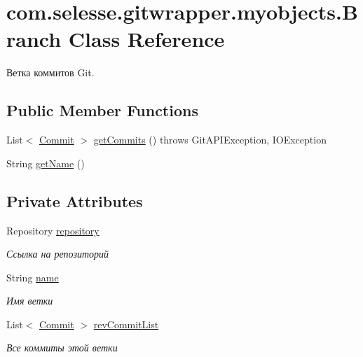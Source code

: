 \hypertarget{classcom_1_1selesse_1_1gitwrapper_1_1myobjects_1_1_branch}{}\section{com.\+selesse.\+gitwrapper.\+myobjects.\+Branch Class Reference}
\label{classcom_1_1selesse_1_1gitwrapper_1_1myobjects_1_1_branch}


Ветка коммитов Git.  


\subsection*{Public Member Functions}
\begin{DoxyCompactItemize}
\item 
List$<$ \hyperlink{classcom_1_1selesse_1_1gitwrapper_1_1myobjects_1_1_commit}{Commit} $>$ \hyperlink{classcom_1_1selesse_1_1gitwrapper_1_1myobjects_1_1_branch_adaccf954960eb975eaadb039158f0cc1}{get\+Commits} ()  throws Git\+A\+P\+I\+Exception, I\+O\+Exception 
\item 
String \hyperlink{classcom_1_1selesse_1_1gitwrapper_1_1myobjects_1_1_branch_abfed85fe8f4604fc77cdb184e176db2c}{get\+Name} ()
\end{DoxyCompactItemize}
\subsection*{Private Attributes}
\begin{DoxyCompactItemize}
\item 
Repository \hyperlink{classcom_1_1selesse_1_1gitwrapper_1_1myobjects_1_1_branch_a8f6120f7811607f19fc5e97353713c27}{repository}
\begin{DoxyCompactList}\small\item\em Ссылка на репозиторий \end{DoxyCompactList}\item 
String \hyperlink{classcom_1_1selesse_1_1gitwrapper_1_1myobjects_1_1_branch_a9ec52c3aeb9e0f61a6bbc702285be865}{name}
\begin{DoxyCompactList}\small\item\em Имя ветки \end{DoxyCompactList}\item 
List$<$ \hyperlink{classcom_1_1selesse_1_1gitwrapper_1_1myobjects_1_1_commit}{Commit} $>$ \hyperlink{classcom_1_1selesse_1_1gitwrapper_1_1myobjects_1_1_branch_ab687c3c9069725a9b3d47ad2a8c78d6b}{rev\+Commit\+List}
\begin{DoxyCompactList}\small\item\em Все коммиты этой ветки \end{DoxyCompactList}\end{DoxyCompactItemize}


